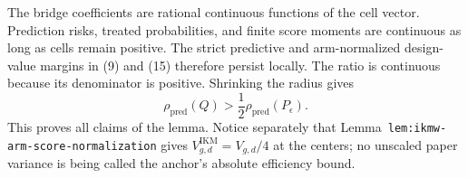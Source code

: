 The bridge coefficients are rational continuous functions of the cell vector. Prediction risks, treated probabilities, and finite score moments are continuous as long as cells remain positive. The strict predictive and arm-normalized design-value margins in (9) and (15) therefore persist locally. The ratio is continuous because its denominator is positive. Shrinking the radius gives
\[
 \rho_{\mathrm{pred}}(Q)>\frac12\rho_{\mathrm{pred}}(P_\epsilon).
\]
This proves all claims of the lemma. Notice separately that Lemma~\texttt{lem:ikmw-arm-score-normalization} gives \(V_{g,d}^{\mathrm{IKM}}=V_{g,d}/4\) at the centers; no unscaled paper variance is being called the anchor's absolute efficiency bound.